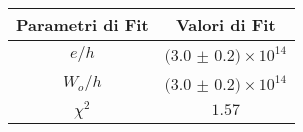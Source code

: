 \begin{tabular}{cc}
\hline
	Parametri di Fit & Valori di Fit\\ 
\hline
	$e/h$ & $(3.0$ $\pm$ $0.2)\times 10^{14}$ \\
	$W_o/h$ & $(3.0$ $\pm$ $0.2)\times 10^{14}$ \\
	$\chi^2$ & $1.57$ \\
\hline
\end{tabular}
